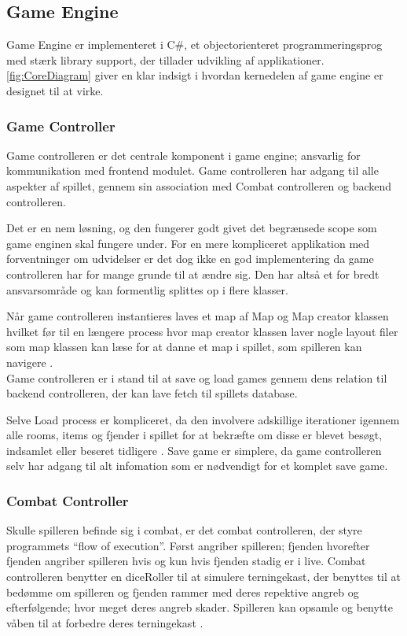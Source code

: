 \subsection{Game Engine}
Game Engine er implementeret i C\#, et objectorienteret programmeringsprog
med stærk library support, der tillader udvikling af applikationer. 
\autoref{fig:CoreDiagram} giver en klar indsigt i hvordan kernedelen af
game engine er designet til at virke. 

\subsubsection{Game Controller}
Game controlleren er det centrale komponent i game engine; ansvarlig for 
kommunikation med frontend modulet. Game controlleren har adgang til alle
aspekter af spillet, gennem sin association med Combat controlleren og 
backend controlleren.

\noindent Det er en nem løsning, og den fungerer godt givet det begrænsede scope som 
game enginen skal fungere under.
For en mere kompliceret applikation med forventninger om udvidelser er det
dog ikke en god implementering da game controlleren har for mange grunde
til at ændre sig. Den har altså et for bredt ansvarsområde og kan formentlig
splittes op i flere klasser.

\noindent Når game controlleren instantieres laves et map af Map og Map creator klassen
hvilket før til en længere process hvor map creator klassen laver nogle
layout filer som map klassen kan læse for at danne et map i spillet, som 
spilleren kan navigere \parencite[Section 11.3.2][]{TekniskBilag}.\\

\noindent Game controlleren er i stand til at save og load games gennem 
dens relation til backend controlleren, der kan lave fetch til spillets
database.

\noindent Selve Load process er kompliceret, da den involvere adskillige iterationer
igennem alle rooms, items og fjender i spillet for at bekræfte om disse er
blevet besøgt, indsamlet eller beseret tidligere \parencite[Section 11.3.1]
[Figure 55]{TekniskBilag}.
Save game er simplere, da game controlleren selv har adgang til alt infomation
som er nødvendigt for et komplet save game.

\subsubsection{Combat Controller}
Skulle spilleren befinde sig i combat, er det combat controlleren, der styre programmets
``flow of execution''. Først angriber spilleren; fjenden hvorefter fjenden angriber spilleren
hvis og kun hvis fjenden stadig er i live. Combat controlleren benytter en diceRoller til
at simulere terningekast, der benyttes til at bedømme om spilleren og fjenden rammer med
deres repektive angreb og efterfølgende; hvor meget deres angreb skader. Spilleren kan opsamle
og benytte våben til at forbedre deres terningekast \parencite[Section 10.3.2][]{TekniskBilag}. 

